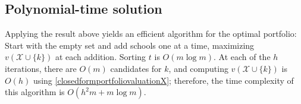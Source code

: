 \documentclass[12pt]{article} %
\DeclareMathOperator*{\argmax}{arg\,max}
\newtheorem{theorem}{Theorem}
\theoremstyle{definition}
\newtheorem{theorem}{정리}
\theoremstyle{definition}
\begin{document}
\subsection{Polynomial-time solution}
Applying the result above yields an efficient algorithm for the optimal portfolio: Start with the empty set and add schools one at a time, maximizing $v(\mathcal{X}\cup \{k\})$ at each addition. Sorting $t$ is  $O(m \log m)$.  At each of the $h$ iterations, there are $O(m)$ candidates for $k$, and computing $v(\mathcal{X}\cup \{k\})$ is $O(h)$ using \eqref{closedformportfoliovaluationX}; therefore, the time complexity of this algorithm is $O(h^2 m + m \log m)$. 
%
\end{document}
